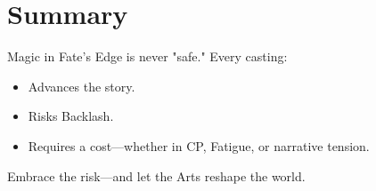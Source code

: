 \section{Summary}

Magic in Fate's Edge is never "safe." Every casting:

\begin{itemize}
  \item Advances the story.
  \item Risks Backlash.
  \item Requires a cost—whether in CP, Fatigue, or narrative tension.
\end{itemize}

Embrace the risk—and let the Arts reshape the world.
